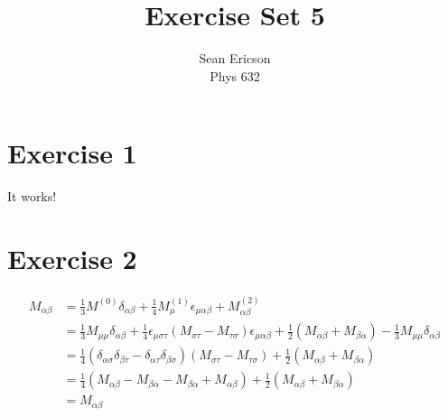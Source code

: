 \documentclass[12pt]{article}
\begin{document}
	
\title{Exercise Set 5}
\author{Sean Ericson \\ Phys 632}
\maketitle

\section*{Exercise 1}
It works!


\section*{Exercise 2}
\begin{align*}
    M_{\alpha\beta} &= \frac{1}{3}M^{(0)}\delta_{\alpha\beta} + \frac{1}{4}M_\mu^{(1)}\epsilon_{\mu\alpha\beta} + M_{\alpha\beta}^{(2)} \\ 
    & = \frac{1}{3}M_{\mu\mu}\delta_{\alpha\beta} + \frac{1}{4}\epsilon_{\mu\sigma\tau}(M_{\sigma\tau} - M_{\tau\sigma})\epsilon_{\mu\alpha\beta} + \frac{1}{2}(M_{\alpha\beta} + M_{\beta\alpha}) - \frac{1}{3}M_{\mu\mu}\delta_{\alpha\beta} \\
    & = \frac{1}{4}(\delta_{\alpha\sigma}\delta_{\beta\tau} - \delta_{\alpha\tau}\delta_{\beta\sigma})(M_{\sigma\tau}-M_{\tau\sigma}) + \frac{1}{2}(M_{\alpha\beta} + M_{\beta\alpha}) \\ 
    & = \frac{1}{4}(M_{\alpha\beta} - M_{\beta\alpha} - M_{\beta\alpha} + M_{\alpha\beta}) + \frac{1}{2}(M_{\alpha\beta} + M_{\beta\alpha}) \\ 
    & = M_{\alpha\beta}
\end{align*}
\end{document}
